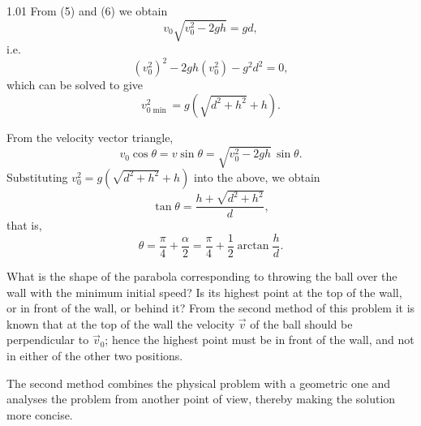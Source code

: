 \begin{solution}{1.01}
From (5) and (6) we obtain
\begin{equation*}
v_0\sqrt{v_0^2-2gh} = gd,
\end{equation*}
i.e.
\begin{equation*}
(v_0^2)^2 - 2gh(v_0^2) - g^2d^2 = 0,
\end{equation*}
which can be solved to give
\begin{equation*}
v_{0\min}^2 = g\left(\sqrt{d^2+h^2}+h\right).
\end{equation*}

From the velocity vector triangle,
\begin{equation*}
v_0\cos\theta = v\sin\theta = \sqrt{v_0^2-2gh}\,\sin\theta.
\end{equation*}
Substituting $v_0^2=g\left(\sqrt{d^2+h^2}+h\right)$ into the above, we obtain
\begin{equation*}
\tan\theta = \frac{h+\sqrt{d^2+h^2}}{d},
\end{equation*}
that is,
\begin{equation*}
\theta = \frac{\pi}{4}+\frac{\alpha}{2}
= \frac{\pi}{4}+\frac{1}{2}\arctan\frac{h}{d}.
\end{equation*}

\begin{commentary}
What is the shape of the parabola corresponding to throwing the ball over the wall with the
minimum initial speed? Is its highest point at the top of the wall, or in front of the wall, or
behind it? From the second method of this problem it is known that at the top of the wall the
velocity $\vec{v}$ of the ball should be perpendicular to $\vec{v}_0$; hence the highest point
must be in front of the wall, and not in either of the other two positions.

The second method combines the physical problem with a geometric one and analyses the problem
from another point of view, thereby making the solution more concise.
\end{commentary}
\end{solution}


